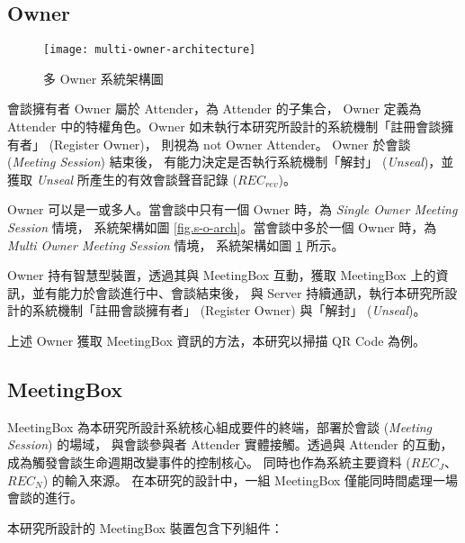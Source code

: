\subsection{Owner}

\begin{figure}[H]
    \centering
    \texttt{[image: multi-owner-architecture]}
    \caption{多 Owner 系統架構圖}
    \label{fig.m-o-arch}
\end{figure}

    會談擁有者 Owner 屬於 Attender，為 Attender 的子集合，
Owner 定義為 Attender 中的特權角色。Owner 如未執行本研究所設計的系統機制「註冊會談擁有者」 (Register Owner)，
則視為 not Owner Attender。 Owner 於會談 ({\it Meeting Session}) 結束後，
有能力決定是否執行系統機制「解封」 ({\it Unseal})，並獲取 {\it Unseal} 所產生的有效會談聲音記錄 ($REC_{rev}$)。

    Owner 可以是一或多人。當會談中只有一個 Owner 時，為 {\it Single Owner Meeting Session} 情境，
系統架構如圖 \ref{fig.s-o-arch}。當會談中多於一個 Owner 時，為 {\it Multi Owner Meeting Session} 情境，
系統架構如圖 \ref{fig.m-o-arch} 所示。

    Owner 持有智慧型裝置，透過其與 MeetingBox 互動，獲取 MeetingBox 上的資訊，並有能力於會談進行中、會談結束後，
與 Server 持續通訊，執行本研究所設計的系統機制「註冊會談擁有者」 (Register Owner) 與「解封」 ({\it Unseal})。

    上述 Owner 獲取 MeetingBox 資訊的方法，本研究以掃描 QR Code 為例。


\subsection{MeetingBox}

    MeetingBox 為本研究所設計系統核心組成要件的終端，部署於會談 ({\it Meeting Session}) 的場域，
與會談參與者 Attender 實體接觸。透過與 Attender 的互動，成為觸發會談生命週期改變事件的控制核心。
同時也作為系統主要資料 ($REC_{J}$、$REC_{N}$) 的輸入來源。
在本研究的設計中，一組 MeetingBox 僅能同時間處理一場會談的進行。

    本研究所設計的 MeetingBox 裝置包含下列組件：

